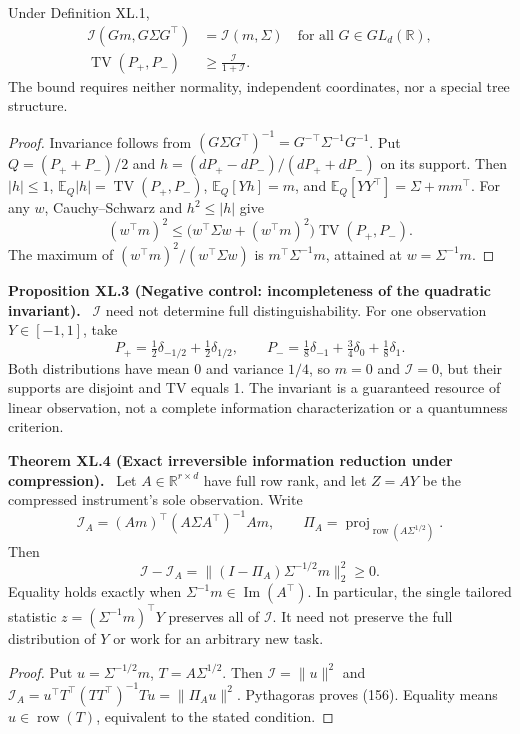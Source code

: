 \documentclass[11pt,a4paper,oneside]{book}
\newcommand{\R}{\mathbb R}\newcommand{\C}{\mathbb C}\newcommand{\Z}{\mathbb Z}\newcommand{\N}{\mathbb N}\newcommand{\Q}{\mathbb Q}
\newcommand{\statement}[3]{\par\medskip\noindent\textbf{#1 #2 (#3).}\ }
\begin{document}
Under Definition XL.1,
\begin{align}\mathcal I(Gm,G\Sigma G^\top)&=\mathcal I(m,\Sigma)\quad\text{for all }G\in GL_d(\R),\tag{154}\\\operatorname{TV}(P_+,P_-)&\ge\frac{\mathcal I}{1+\mathcal I}.\tag{155}\end{align}
The bound requires neither normality, independent coordinates, nor a special tree structure.
\begin{proof}
Invariance follows from $(G\Sigma G^\top)^{-1}=G^{-\top}\Sigma^{-1}G^{-1}$. Put $Q=(P_++P_-)/2$ and $h=(dP_+-dP_-)/(dP_++dP_-)$ on its support. Then $|h|\le1$, $\mathbb E_Q|h|=\operatorname{TV}(P_+,P_-)$, $\mathbb E_Q[Yh]=m$, and $\mathbb E_Q[YY^\top]=\Sigma+mm^\top$. For any $w$, Cauchy--Schwarz and $h^2\le|h|$ give
\[(w^\top m)^2\le\bigl(w^\top\Sigma w+(w^\top m)^2\bigr)\operatorname{TV}(P_+,P_-).\]
The maximum of $(w^\top m)^2/(w^\top\Sigma w)$ is $m^\top\Sigma^{-1}m$, attained at $w=\Sigma^{-1}m$.
\end{proof}
\statement{Proposition}{XL.3}{Negative control: incompleteness of the quadratic invariant}
$\mathcal I$ need not determine full distinguishability. For one observation $Y\in[-1,1]$, take
\[P_+=\tfrac12\delta_{-1/2}+\tfrac12\delta_{1/2},\qquad P_-=\tfrac18\delta_{-1}+\tfrac34\delta_0+\tfrac18\delta_1.\]
Both distributions have mean 0 and variance $1/4$, so $m=0$ and $\mathcal I=0$, but their supports are disjoint and TV equals 1. The invariant is a guaranteed resource of linear observation, not a complete information characterization or a quantumness criterion.
\statement{Theorem}{XL.4}{Exact irreversible information reduction under compression}
Let $A\in\R^{r\times d}$ have full row rank, and let $Z=AY$ be the compressed instrument's sole observation. Write
\[\mathcal I_A=(Am)^\top(A\Sigma A^\top)^{-1}Am,\qquad\Pi_A=\operatorname{proj}_{\operatorname{row}(A\Sigma^{1/2})}.\]
Then
\begin{equation}\mathcal I-\mathcal I_A=\|(I-\Pi_A)\Sigma^{-1/2}m\|_2^2\ge0.\tag{156}\end{equation}
Equality holds exactly when $\Sigma^{-1}m\in\operatorname{Im}(A^\top)$. In particular, the single tailored statistic $z=(\Sigma^{-1}m)^\top Y$ preserves all of $\mathcal I$. It need not preserve the full distribution of $Y$ or work for an arbitrary new task.
\begin{proof}
Put $u=\Sigma^{-1/2}m$, $T=A\Sigma^{1/2}$. Then $\mathcal I=\|u\|^2$ and $\mathcal I_A=u^\top T^\top(TT^\top)^{-1}Tu=\|\Pi_Au\|^2$. Pythagoras proves (156). Equality means $u\in\operatorname{row}(T)$, equivalent to the stated condition.
\end{proof}
\end{document}
